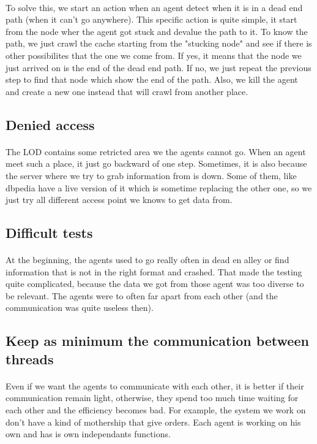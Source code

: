 \documentclass{article}
\begin{document}
		\paragraph{}
			To solve this, we start an action when an agent detect when it is in a dead end path (when it can't go anywhere).
			This specific action is quite simple, it start from the node wher the agent got stuck and devalue the path to it.
			To know the path, we just crawl the cache starting from the "stucking node"
			and see if there is other possibilites that the one we come from.
			If yes, it means that the node we just arrived on is the end of the dead end path.
			If no, we just repeat the previous step to find that node which show the end of the path.
			Also, we kill the agent and create a new one instead that will crawl from another place.
	\subsection{Denied access}
		\paragraph{}
			The LOD contains some retricted area we the agents cannot go.
			When an agent meet such a place, it just go backward of one step.
			Sometimes, it is also because the server where we try to grab information from is down.
			Some of them, like dbpedia have a live version of it which is sometime replacing the other one,
			so we just try all different access point we knows to get data from.
	\subsection{Difficult tests}
		\paragraph{}
			At the beginning, the agents used to go really often in dead en alley
			or find information that is not in the right format and crashed.
			That made the testing quite complicated, because the data we got from those agent was too diverse to be relevant.
			The agents were to often far apart from each other (and the communication was quite useless then).
	\subsection{Keep as minimum the communication between threads}
		\paragraph{}
			Even if we want the agents to communicate with each other, it is better if their communication remain light,
			otherwise, they spend too much time waiting for each other and the efficiency becomes bad.
			For example, the system we work on don't have a kind of mothership that give orders.
			Each agent is working on his own and has is own independants functions.
\end{document}

